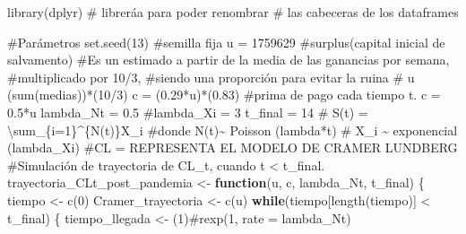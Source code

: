 \documentclass[
  us-letterpaper,
]{scrreprt}
\newenvironment{Shaded}{\begin{snugshade}}{\end{snugshade}}
\newcommand{\CommentTok}[1]{\textcolor[rgb]{0.37,0.37,0.37}{#1}}
\newcommand{\ControlFlowTok}[1]{\textcolor[rgb]{0.00,0.23,0.31}{\textbf{#1}}}
\newcommand{\DecValTok}[1]{\textcolor[rgb]{0.68,0.00,0.00}{#1}}
\newcommand{\FloatTok}[1]{\textcolor[rgb]{0.68,0.00,0.00}{#1}}
\newcommand{\FunctionTok}[1]{\textcolor[rgb]{0.28,0.35,0.67}{#1}}
\newcommand{\NormalTok}[1]{\textcolor[rgb]{0.00,0.23,0.31}{#1}}
\newcommand{\OtherTok}[1]{\textcolor[rgb]{0.00,0.23,0.31}{#1}}
\newcommand{\SpecialCharTok}[1]{\textcolor[rgb]{0.37,0.37,0.37}{#1}}
\theoremstyle{plain}
\theoremstyle{plain}
\theoremstyle{definition}
\theoremstyle{remark}
\begin{document}
\begin{Shaded}
\begin{Highlighting}[]
\FunctionTok{library}\NormalTok{(dplyr) }\CommentTok{\# libreráa para poder renombrar }
\CommentTok{\# las cabeceras de los dataframes}

\CommentTok{\#Parámetros}
\FunctionTok{set.seed}\NormalTok{(}\DecValTok{13}\NormalTok{) }\CommentTok{\#semilla fija}
\NormalTok{u }\OtherTok{=} \DecValTok{1759629} \CommentTok{\#surplus(capital inicial de salvamento)}
\CommentTok{\#Es un estimado a partir de la media de las ganancias por semana, }
\CommentTok{\#multiplicado por 10/3, }
\CommentTok{\#siendo una proporción para evitar la ruina}
\CommentTok{\# u (sum(medias))*(10/3)}
\NormalTok{c }\OtherTok{=}\NormalTok{ (}\FloatTok{0.29}\SpecialCharTok{*}\NormalTok{u)}\SpecialCharTok{*}\NormalTok{(}\FloatTok{0.83}\NormalTok{) }\CommentTok{\#prima de pago cada tiempo t. c = 0.5*u}
\NormalTok{lambda\_Nt }\OtherTok{=} \FloatTok{0.5}
\CommentTok{\#lambda\_Xi = 3}
\NormalTok{t\_final }\OtherTok{=} \DecValTok{14}
\CommentTok{\# S(t) = \textbackslash{}sum\_\{i=1\}\^{}\{N(t)\}X\_i}
\CommentTok{\#donde N(t)\textasciitilde{} Poisson (lambda*t)}
\CommentTok{\# X\_i \textasciitilde{} exponencial (lambda\_Xi)}
\CommentTok{\#CL = REPRESENTA EL MODELO DE CRAMER LUNDBERG}
\CommentTok{\#Simulación de trayectoria de CL\_t, cuando t \textless{} t\_final.}
\NormalTok{trayectoria\_CLt\_post\_pandemia }\OtherTok{\textless{}{-}} \ControlFlowTok{function}\NormalTok{(u, c, lambda\_Nt, t\_final)}
\NormalTok{\{}
\NormalTok{  tiempo }\OtherTok{\textless{}{-}} \FunctionTok{c}\NormalTok{(}\DecValTok{0}\NormalTok{)}
\NormalTok{  Cramer\_trayectoria }\OtherTok{\textless{}{-}} \FunctionTok{c}\NormalTok{(u)}
  \ControlFlowTok{while}\NormalTok{(tiempo[}\FunctionTok{length}\NormalTok{(tiempo)] }\SpecialCharTok{\textless{}}\NormalTok{ t\_final)}
\NormalTok{  \{}
\NormalTok{    tiempo\_llegada }\OtherTok{\textless{}{-}}\NormalTok{ (}\DecValTok{1}\NormalTok{)}\CommentTok{\#rexp(1, rate = lambda\_Nt)}
    

\end{Highlighting}
\end{Shaded}
\end{document}

